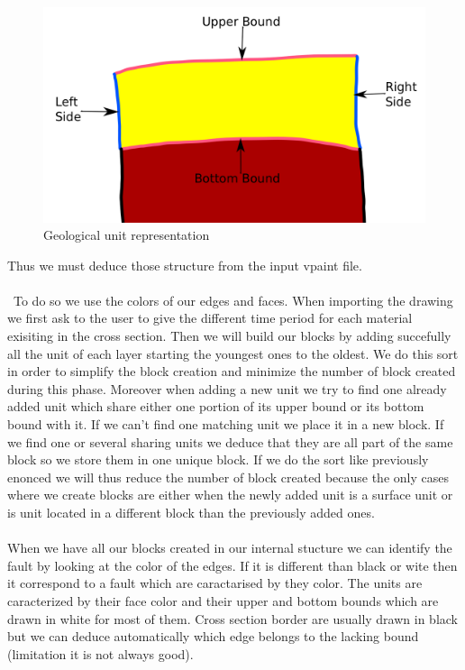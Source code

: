 \documentclass[12pt, a4paper]{report} %
\begin{document}
 \begin{figure}[H]
	\centering
	\includegraphics[scale=0.3]{unitDescriptionEdit.png}
	\caption{Geological unit representation}
\end{figure}

Thus we must deduce those structure from the input vpaint file. \\\\\
To do so we use the colors of our edges and faces. When importing the drawing we first ask to the user to give the different time period for each material exisiting in the cross section. Then we will build our blocks by adding succefully all the unit of each layer starting the youngest ones to the oldest. We do this sort in order to simplify the block creation and minimize the number of block created during this phase. Moreover when adding a new unit we try to find one already added unit which share either one portion of its upper bound  or its bottom bound with it. If we can't find one matching unit we place it in a new block. If we find one or several sharing units we deduce that they are all part of the same block so we store them in one unique block. If we do the sort like previously enonced we will thus reduce the number of block created because the only cases where we create blocks are either when the newly added unit is a surface unit or is unit located in a different block than the previously added ones.\\\\

When we have all our blocks created in our internal stucture we can identify the fault by looking at the color of the edges. If it is different than black or wite then it correspond to a fault which are caractarised by they color. The units are caracterized by their face color and their upper and bottom bounds which are drawn in white for most of them. Cross section border are usually drawn in black but we can deduce automatically which edge belongs to the lacking bound (limitation it is not always good).\\\\
\end{document}
